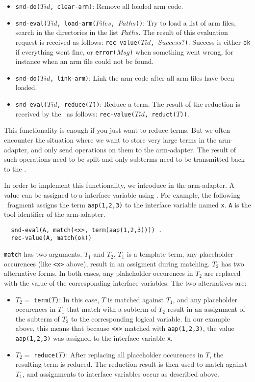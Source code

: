 \begin{itemize}
\item {\tt snd-do($Tid$, clear-arm)}: Remove all loaded arm code.
\item {\tt snd-eval($Tid$, load-arm($Files$, $Paths$))}: Try to load a list
      of arm files, search in the directories in the list $Paths$.
      The result of this evaluation request is received as follows:
      {\tt rec-value($Tid$, $Success?$)}. Success is either {\tt ok} if
      everything went fine, or {\tt error($Msg$)} when something went wrong,
      for instance when an arm file could not be found.
\item {\tt snd-do($Tid$, link-arm)}: Link the arm code after all arm files
      have been loaded.
\item {\tt snd-eval($Tid$, reduce($T$))}: Reduce a term. The result
      of the reduction is received by the \TB\ as follows:
      {\tt rec-value($Tid$, reduct($T$))}.
\end{itemize}

This functionality is enough if you just want to reduce terms.
But we often encounter the situation where we want to store very
large terms in the arm-adapter, and only send operations on them
to the arm-adapter. The result of such operations need to be
split and only subterms need to be transmitted back to the \TB.

In order to implement this functionality, we introduce  in the arm-adapter. A value can be assigned to a interface
variable using . For example, the following
\TB\ fragment assigns the term {\tt aap(1,2,3)} to the interface variable
named {\tt x}. {\tt A} is the tool identifier of the arm-adapter.
\begin{verbatim}
  snd-eval(A, match(<x>, term(aap(1,2,3)))) .
  rec-value(A, match(ok))
\end{verbatim}

{\tt match} has two arguments, $T_1$ and $T_2$. 
$T_1$ is a template term,
any placeholder occurences (like {\tt <x>} above), result in
an assigment during matching.
$T_2$ has two alternative forms. In both cases, any
plaheholder occurences in $T_2$ are replaced with the value
of the corresponding interface variables.
The two alternatives are:
\begin{itemize}
\item $T_2 =$ {\tt term($T$)}: In this case, $T$ is matched against
      $T_1$, and any placeholder occurences in $T_1$ that match with
      a subterm of $T_2$ result in an assignment of the subterm of $T_2$
      to the corresponding logical variable. 
      In our example above, this means that because {\tt <x>} matched 
      with {\tt aap(1,2,3)}, the value {\tt aap(1,2,3)} was assigned to 
      the interface variable {\tt x}.
\item $T_2 =$ {\tt reduce($T$)}: After replacing all placeholder occurences
      in {\tt $T$}, the resulting term is reduced. The reduction result is
      then used to match against $T_1$, and assignments to interface variables
      occur as described above.
\end{itemize}

